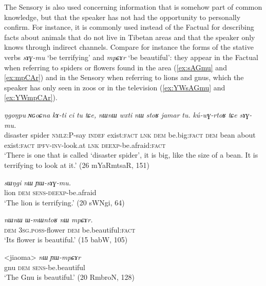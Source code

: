 \documentclass[oldfontcommands,oneside,a4paper,11pt]{article}
\newcommand{\ipa}[1]{{\phon\textit{#1}}} %
\newcommand{\factual}[1]{\textsc{:fact}}
\begin{document}
The Sensory is also used concerning information that is somehow part of common knowledge, but that the speaker has not had the opportunity to personally confirm. For instance, it is commonly used instead of the Factual for describing facts about animals that do not live in Tibetan areas and that the speaker only knows through indirect channels. Compare for instance the forms of the stative verbs \ipa{sɤɣ-mu} `be terrifying' and \ipa{mpɕɤr} `be beautiful': they appear in the Factual when referring to  spiders or flowers found in the area (\ref{ex:sAGmu} and \ref{ex:mpCAr}) and in the Sensory when referring to lions and gnus, which the speaker has only seen in zoos or in the television  (\ref{ex:YWsAGmu} and \ref{ex:YWmpCAr}).
 
 \begin{exe}
\ex \label{ex:sAGmu}
\gll 
\ipa{ŋgoŋpu}  	\ipa{ɴɢoɕna}  	\ipa{kɤ-ti}  	\ipa{ci}  	\ipa{tu}  	\ipa{tɕe,}  	\ipa{nɯnɯ}  	\ipa{wxti}  	\ipa{nɯ}  	\ipa{stoʁ}  	\ipa{jamar}  	\ipa{tu.}  	\ipa{kú-wɣ-rtoʁ}  	\ipa{tɕe}  	\ipa{sɤɣ-mu.}  \\
disaster spider \textsc{nmlz}:P-say \textsc{indef} exist\factual{} \textsc{lnk} \textsc{dem} be.big\factual{}  \textsc{dem} bean about exist\factual{} \textsc{ipfv-inv}-look.at \textsc{lnk} \textsc{deexp}-be.afraid\factual{}  \\
\glt `There is one that is  called `disaster spider', it is big, like the size of a bean. It is terrifying to look at it.' (26 mYaRmtsaR, 151)
\end{exe}

\begin{exe}
\ex \label{ex:YWsAGmu}
\gll 
\ipa{sɯŋgi}  	\ipa{nɯ}  	\ipa{ɲɯ-sɤɣ-mu.}  \\
lion \textsc{dem} \textsc{sens-deexp}-be.afraid \\
\glt `The lion is terrifying.' (20 sWNgi, 64)
\end{exe}


\begin{exe}
\ex \label{ex:mpCAr}
\gll
\ipa{nɯnɯ}  	\ipa{ɯ-mɯntoʁ}  	\ipa{nɯ}  	\ipa{mpɕɤr.}  \\
\textsc{dem} \textsc{3sg.poss}-flower \textsc{dem} be.beautiful\factual{} \\
\glt `Its flower is beautiful.' (15 babW, 105)
\end{exe}


\begin{exe}
\ex \label{ex:YWmpCAr}
\gll 
<jiaoma> 	\ipa{nɯ}  	\ipa{ɲɯ-mpɕɤr}  \\
gnu \textsc{dem} \textsc{sens}-be.beautiful \\
\glt `The Gnu is beautiful.' (20 RmbroN, 128)
\end{exe}
\end{document}
